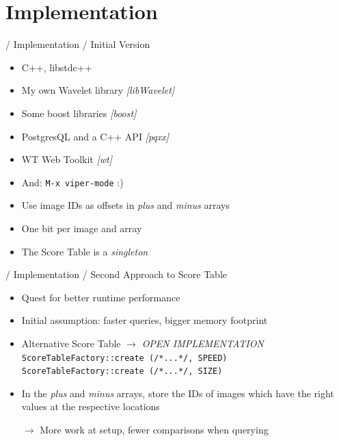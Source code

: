 \documentclass{beamer}
\newcommand\rarrow{$\longrightarrow$ } %
\begin{document}
\section{Implementation}

\begin{frame}{/ Implementation / Initial Version}

  \begin{itemize}
  \item C++, libstdc++
  \item My own Wavelet library \emph{[libWavelet]}
  \item Some boost libraries \emph{[boost]}
  \item PostgresQL and a C++ API \emph{[pqxx]}
  \item WT Web Toolkit \emph{[wt]}
    \pause
  \item And: \texttt{M-x viper-mode} :)
  \end{itemize}

    \pause
  \begin{itemize}
  \item Use image IDs as offsets in \emph{plus} and \emph{minus} arrays
  \item One bit per image and array
  \item The Score Table is a \emph{singleton}
  \end{itemize}

\end{frame}

\begin{frame}{/ Implementation / Second Approach to Score Table}

  \begin{itemize}
  \item Quest for better runtime performance
  \item Initial assumption: faster queries, bigger memory footprint
  \item Alternative Score Table \rarrow \emph{OPEN IMPLEMENTATION}\\
    \texttt{ScoreTableFactory::create (/*...*/, SPEED)}\\
    \texttt{ScoreTableFactory::create (/*...*/, SIZE)}\\
  \end{itemize}

  \pause
  \begin{itemize}
  \item In the \emph{plus} and \emph{minus} arrays, store the IDs of
    images which have the right values at the respective locations

    \rarrow More work at setup, fewer comparisons when querying
  \end{itemize}

\end{frame}
\end{document}
